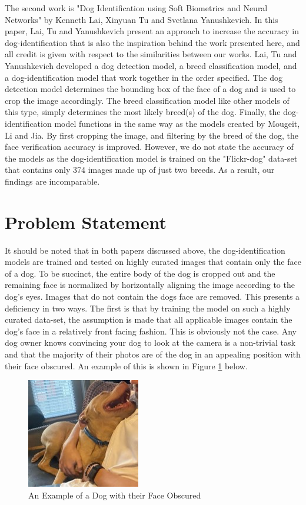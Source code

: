 \documentclass{article}
\begin{document}
	The second work is "Dog Identification using Soft Biometrics and Neural Networks" \cite{LaiKenneth2019DIuS} by Kenneth Lai, Xinyuan Tu and Svetlana Yanushkevich.  In this paper, Lai, Tu and Yanushkevich present an approach to increase the accuracy in dog-identification that is also the inspiration behind the work presented here, and all credit is given with respect to the similarities between our works.  Lai, Tu and Yanushkevich developed a dog detection model, a breed classification model, and a dog-identification model that work together in the order specified.   The dog detection model determines the bounding box of the face of a dog and is used to crop the image accordingly.  The breed classification model like other models of this type, simply determines the most likely breed(s) of the dog.  Finally, the dog-identification model functions in the same way as the models created by Mougeit, Li and Jia.  By first cropping the image, and filtering by the breed of the dog, the face verification accuracy is improved.  However, we do not state the accuracy of the models as the dog-identification model is trained on the "Flickr-dog" \cite{LaiKenneth2019DIuS} data-set that contains only 374 images made up of just two breeds.  As a result, our findings are incomparable.

\section{Problem Statement}
	It should be noted that in both papers discussed above, the dog-identification models are trained and tested on highly curated images that contain only the face of a dog.  To be succinct, the entire body of the dog is cropped out and the remaining face is normalized by horizontally aligning the image according to the dog's eyes.  Images that do not contain the dogs face are removed.  This presents a deficiency in two ways.  The first is that by training the model on such a highly curated data-set, the assumption is made that all applicable images contain the dog's face in a relatively front facing fashion.  This is obviously not the case.  Any dog owner knows convincing your dog to look at the camera is a non-trivial task and that the majority of their photos are of the dog in an appealing position with their face obscured.  An example of this is shown in Figure \ref{fig:x dog no face} below.  


\begin{figure}[h]
\centering
	\includegraphics{final-report-images/nofacedog.jpg}
\caption{An Example of a Dog with their Face Obscured}
\label{fig:x dog no face}
\end{figure}
\newpage
\end{document}
